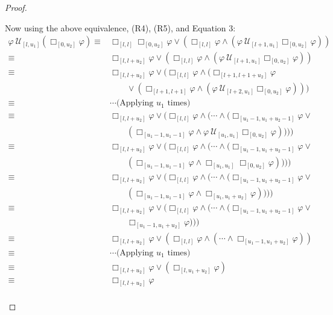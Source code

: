 \documentclass{article}
\begin{document}
\begin{proof}
\begin{enumerate}
\begin{enumerate}
    \end{enumerate}
Now using the above equivalence, (R4), (R5), and Equation 3:
\begin{align*}
    {\varphi}\ \mathcal{U}_{[l,u_1]}{(\Box_{[0,u_2]}{\varphi})} \equiv & \Box_{[l,l]}{\Box_{[0,u_2]}{\varphi}} \lor (\Box_{[l,l]}{\varphi} \land ({\varphi}\ \mathcal{U}_{[l+1,u_1]}{\Box_{[0,u_2]}{\varphi}})) \\
    \equiv & \Box_{[l,l+u_2]}{\varphi} \lor (\Box_{[l,l]}{\varphi} \land ({\varphi}\ \mathcal{U}_{[l+1,u_1]}{\Box_{[0,u_2]}{\varphi}})) \\
    \equiv & \Box_{[l,l+u_2]}{\varphi} \lor (\Box_{[l,l]}{\varphi} \land (\Box_{[l+1,l+1+u_2]}{\varphi} \\
    & \qquad \lor (\Box_{[l+1,l+1]}{\varphi} \land ({\varphi}\ \mathcal{U}_{[l+2,u_1]}{\Box_{[0,u_2]}{\varphi}}))) \\
    \equiv & \cdots \text{(Applying } u_1 \text{ times)} \\
    \equiv & \Box_{[l,l+u_2]}{\varphi} \lor (\Box_{[l,l]}{\varphi} \land (\cdots \land (\Box_{[u_1-1,u_1+u_2-1]}{\varphi} \lor \\
    & \qquad (\Box_{[u_1-1,u_1-1]}{\varphi} \land {\varphi}\ \mathcal{U}_{[u_1,u_1]}{\Box_{[0,u_2]}{\varphi}})))) \\
    \equiv & \Box_{[l,l+u_2]}{\varphi} \lor (\Box_{[l,l]}{\varphi} \land (\cdots \land (\Box_{[u_1-1,u_1+u_2-1]}{\varphi} \lor \\
    & \qquad (\Box_{[u_1-1,u_1-1]}{\varphi} \land \Box_{[u_1,u_1]}{\Box_{[0,u_2]}{\varphi}})))) \\
    \equiv & \Box_{[l,l+u_2]}{\varphi} \lor (\Box_{[l,l]}{\varphi} \land (\cdots \land (\Box_{[u_1-1,u_1+u_2-1]}{\varphi} \lor \\
    & \qquad (\Box_{[u_1-1,u_1-1]}{\varphi} \land \Box_{[u_1,u_1+u_2]}{\varphi})))) \\
    \equiv & \Box_{[l,l+u_2]}{\varphi} \lor (\Box_{[l,l]}{\varphi} \land (\cdots \land (\Box_{[u_1-1,u_1+u_2-1]}{\varphi} \lor \\ 
    & \qquad \Box_{[u_1-1,u_1+u_2]}{\varphi}))) \\
    \equiv & \Box_{[l,l+u_2]}{\varphi} \lor (\Box_{[l,l]}{\varphi} \land (\cdots \land \Box_{[u_1-1,u_1+u_2]}{\varphi})) \\
    \equiv & \cdots \text{(Applying } u_1 \text{ times)} \\
    \equiv & \Box_{[l,l+u_2]}{\varphi} \lor (\Box_{[l,u_1+u_2]}{\varphi}) \\
    \equiv & \Box_{[l,l+u_2]}{\varphi} \\
\end{align*}

\end{enumerate}

\end{proof}
\end{document}
